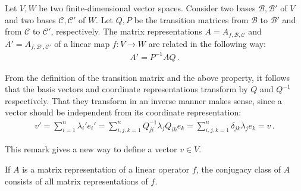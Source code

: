     \begin{result}\label{linalgebra:transition_matrix_representation}
        Let $V,W$ be two finite-dimensional vector spaces. Consider two bases $\mathcal{B},\mathcal{B}'$ of $V$ and two bases $\mathcal{C},\mathcal{C}'$ of $W$. Let $Q,P$ be the transition matrices from $\mathcal{B}$ to $\mathcal{B}'$ and from $\mathcal{C}$ to $\mathcal{C}'$, respectively. The matrix representations $A=A_{f,\mathcal{B},\mathcal{C}}$ and $A'=A_{f,\mathcal{B}',\mathcal{C}'}$ of a linear map $f:V\rightarrow W$ are related in the following way:
        \begin{gather}
            A' = P^{-1}AQ\,.
        \end{gather}
    \end{result}

    \begin{remark}
        From the definition of the transition matrix and the above property, it follows that the basis vectors and coordinate representations transform by $Q$ and $Q^{-1}$ respectively. That they transform in an inverse manner makes sense, since a vector should be independent from its coordinate representation:
        \begin{gather}
            v'=\sum_{i=1}^n\lambda_i'e_i'=\sum_{i,j,k=1}^nQ^{-1}_{ji}\lambda_jQ_{ik}e_k = \sum_{i,j,k=1}^n\delta_{jk}\lambda_je_k = v\,.
        \end{gather}
    \end{remark}
    This remark gives a new way to define a vector $v\in V$.

    \begin{remark}
        If $A$ is a matrix representation of a linear operator $f$, the conjugacy class of $A$ consists of all matrix representations of $f$.
    \end{remark}

